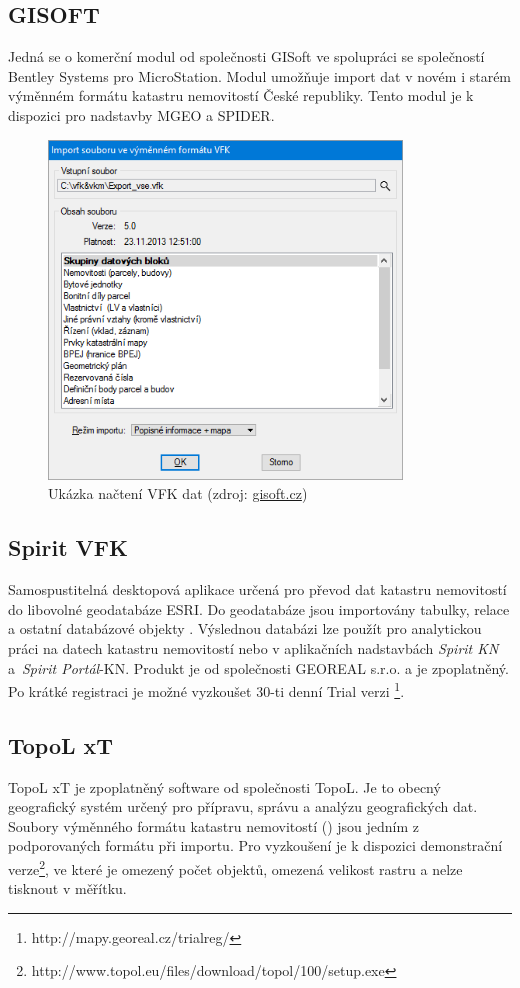\subsection{GISOFT}
Jedná se o komerční modul od společnosti GISoft ve spolupráci se
společností Bentley Systems pro MicroStation. Modul umožňuje import
dat v novém i starém výměnném formátu katastru nemovitostí České
republiky. Tento modul je k dispozici pro nadstavby MGEO a
SPIDER.\cite{gisoft}

\begin{figure}[H]
	 \centering
      \includegraphics[height=9cm]{./pictures/gisoft.png}
      \caption{Ukázka načtení VFK dat (zdroj:
\href{http://www.gisoft.cz/cze/files/Moduly/import-vfk.png}{gisoft.cz})}
      \label{fig:gisoft}
  \end{figure}
\subsection{Spirit VFK}
Samospustitelná desktopová aplikace určená pro převod dat katastru
nemovitostí do libovolné geodatabáze ESRI. Do geodatabáze jsou
importovány tabulky, relace a ostatní databázové objekty
. Výslednou databázi lze použít pro analytickou práci na
datech katastru nemovitostí nebo v aplikačních nadstavbách
\textit{Spirit KN} a~\textit{Spirit Portál}-KN. Produkt je od
společnosti GEOREAL s.r.o. a je zpoplatněný. Po krátké registraci je
možné vyzkoušet 30-ti denní Trial
verzi \footnote{http://mapy.georeal.cz/trialreg/}.\cite{spirit_vfk}
\subsection{TopoL xT}
TopoL xT je zpoplatněný software od společnosti TopoL. Je to obecný
geografický systém určený pro přípravu, správu a analýzu geografických
dat. Soubory výměnného formátu katastru nemovitostí () jsou
jedním z podporovaných formátu při importu. Pro vyzkoušení je k
dispozici demonstrační
verze\footnote{http://www.topol.eu/files/download/topol/100/setup.exe},
ve které je omezený počet objektů, omezená velikost rastru a nelze
tisknout v měřítku.\citep{topol}

